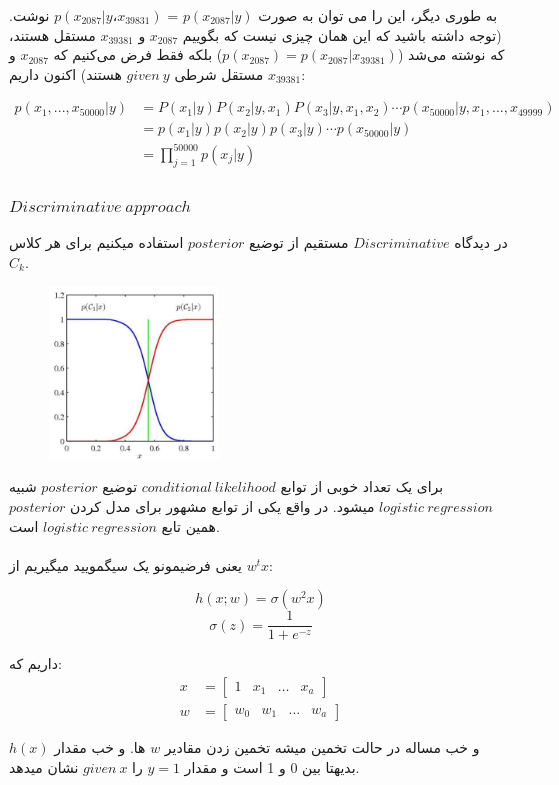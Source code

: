 \documentclass[12pt]{article}
\begin{document}
به طوری دیگر، این را می توان به صورت $p(x_{2087}|y)$ = $p(x_{2087}|y، x_{39831})$ نوشت. (توجه داشته باشید که این همان چیزی نیست که بگوییم $x_{2087}$ و $x_{39381}$ مستقل هستند، که نوشته می‌شد ($p(x_{2087}) = p(x_{2087}|x_{39381})$) بلکه فقط فرض می‌کنیم که $x_{2087}$ و $x_{39381}$ مستقل شرطی $given\:y$ هستند) اکنون داریم:

\begin{align*}
p(x_1, ..., x_{50000} | y) &= P(x_1 | y)P(x_2 | y, x_1)P(x_3 | y, x_1, x_2) \cdots p(x_{50000} | y, x_1, ..., x_{49999}) \\
&= p(x_1 | y)p(x_2 | y)p(x_3 | y) \cdots  p(x_{50000} | y) \\
&= \prod_{j=1}^{50000} p(x_j | y)
\end{align*}

\subsubsection*{$Discriminative\:approach$}
در دیدگاه $Discriminative$ مستقیم از توضیع $posterior$ استفاده میکنیم برای هر کلاس $C_k$. 

\begin{figure}[h]
  \centering
  \includegraphics[width=0.4\textwidth]{figs/8.png}
  \label{8}
\end{figure}

برای یک تعداد خوبی از توابع $conditional\:likelihood$ توضیع $posterior$ شبیه $logistic\:regression$ میشود. در واقع یکی از توابع مشهور برای مدل کردن $posterior$ همین تابع $logistic\:regression$ است.
\\
\\
یعنی فرضیمونو یک سیگمویید میگیریم از $w^tx$:

\[ 
h(x; w) = \sigma(w^2x)
\]
\[ 
\sigma(z) = \frac{1}{1 + e^{-z}}
\]


داریم که:
\begin{align*}
x &= \begin{bmatrix}
1 & x_1 & \dots & x_a
\end{bmatrix} \\
w &= \begin{bmatrix}
w_0 & w_1 & \dots & w_a
\end{bmatrix}
\end{align*}

و خب مساله در حالت تخمین میشه تخمین زدن مقادیر $w$ ها.
و خب مقدار $h(x)$ بدیهتا بین 0 و 1 است و مقدار $y=1$ را $given\:x$ نشان میدهد.
\end{document}
